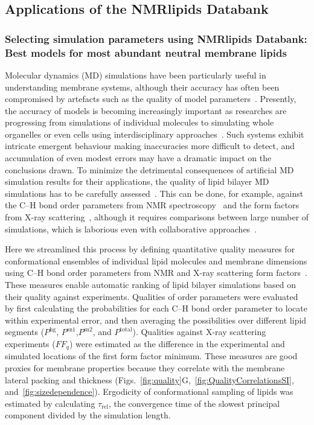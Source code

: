 \documentclass[fleqn,10pt]{wlscirep}
\begin{document}
\subsection{Applications of the NMRlipids Databank}
\subsubsection{Selecting simulation parameters using NMRlipids Databank: Best models for most abundant neutral membrane lipids}
Molecular dynamics (MD) simulations have been particularly useful in understanding membrane systems, although their accuracy has often been compromised by artefacts such as the quality of model parameters~\cite{antila22b,gupta22}. Presently, the accuracy of models is becoming increasingly important as researches are progressing from simulations of individual molecules to simulating whole organelles or even cells using interdisciplinary approaches~\cite{johnson15,thornburg22,gupta22}. Such systems exhibit intricate emergent behaviour making inaccuracies more difficult to detect, and accumulation of even modest errors may have a dramatic impact on the conclusions drawn. To minimize the detrimental consequences of artificial MD simulation results for their applications, the quality of lipid bilayer MD simulations has to be carefully assessed~\cite{antila22b}. This can be done, for example, against the C--H bond order parameters from NMR spectroscopy~\cite{bacle21,Wur23} and the form factors from X-ray scattering~\cite{ollila16}, although it requires comparisons between large number of simulations, which is laborious even with collaborative approaches~\cite{botan15,catte16,antila19,bacle21}. 

Here we streamlined this process by defining quantitative quality measures 
for conformational ensembles of individual lipid molecules and membrane dimensions using C--H bond order parameters from NMR and X-ray scattering form factors~\cite{ollila16}. These measures enable automatic ranking of lipid bilayer simulations based on their quality against experiments. Qualities of order parameters were evaluated by first calculating the probabilities for each C--H bond order parameter to locate within experimental error, and then averaging the possibilities over different lipid segments ($P^{\mathrm{hg}}$, $P^{\mathrm{sn1}}$,$P^{\mathrm{sn2}}$, and $P^{\mathrm{total}}$). Qualities against X-ray scattering experiments ($FF_q$) were estimated as the difference in the experimental and simulated locations of the first form factor minimum. These measures are good proxies for membrane properties 
because they correlate with the membrane lateral packing and thickness (Figs.~\ref{fig:quality}G,~\ref{fig:QualityCorrelationsSI}, and~\ref{fig:sizedependence}). Ergodicity of conformational sampling of lipids was estimated by calculating $\tau_\mathrm{rel}$, the convergence time of the slowest principal component divided by the simulation length. 
\end{document}
